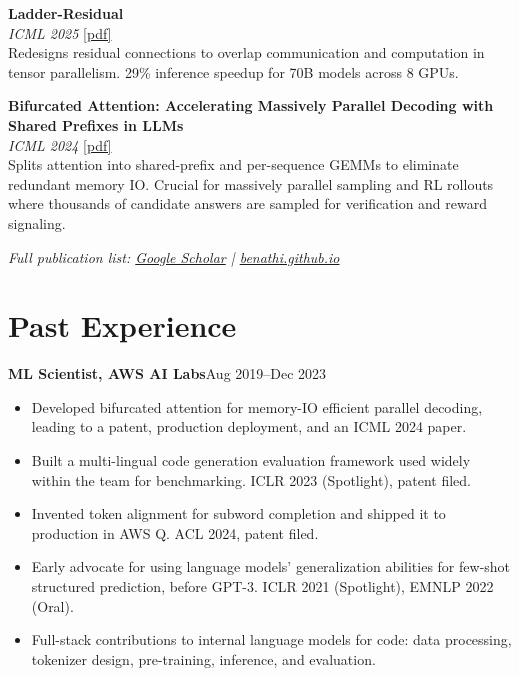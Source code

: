 \documentclass[11pt,letterpaper]{article}
\newcommand{\entrytitle}[2]{%
  \noindent\textbf{#1}\hfill #2\\
}
\begin{document}
\vspace{6pt}
\noindent\textbf{Ladder-Residual}\\
\textit{ICML 2025} \href{https://arxiv.org/abs/2501.06589}{[pdf]}\\[2pt]
Redesigns residual connections to overlap communication and computation in tensor parallelism. 29\% inference speedup for 70B models across 8 GPUs.

\vspace{6pt}
\noindent\textbf{Bifurcated Attention: Accelerating Massively Parallel Decoding with Shared Prefixes in LLMs}\\
\textit{ICML 2024} \href{https://arxiv.org/abs/2403.08845}{[pdf]}\\[2pt]
Splits attention into shared-prefix and per-sequence GEMMs to eliminate redundant memory IO. Crucial for massively parallel sampling and RL rollouts where thousands of candidate answers are sampled for verification and reward signaling.

\vspace{6pt}
\noindent\textit{Full publication list: \href{https://scholar.google.com/citations?user=KZpZTTQAAAAJ}{Google Scholar} | \href{https://benathi.github.io}{benathi.github.io}}

\section{Past Experience}

\entrytitle{ML Scientist, AWS AI Labs}{Aug 2019--Dec 2023}
\begin{itemize}
\item Developed bifurcated attention for memory-IO efficient parallel decoding, leading to a patent, production deployment, and an ICML 2024 paper.
\item Built a multi-lingual code generation evaluation framework used widely within the team for benchmarking. ICLR 2023 (Spotlight), patent filed.
\item Invented token alignment for subword completion and shipped it to production in AWS Q. ACL 2024, patent filed.
\item Early advocate for using language models' generalization abilities for few-shot structured prediction, before GPT-3. ICLR 2021 (Spotlight), EMNLP 2022 (Oral).
\item Full-stack contributions to internal language models for code: data processing, tokenizer design, pre-training, inference, and evaluation.
\end{itemize}
\end{document}
